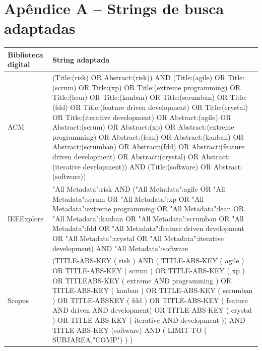 \documentclass[
	12pt,
	openright,
	twoside,
	a4paper,
	english,
	brazil
	]{abntex2}
\begin{document}
\postextual


\appendix

\chapter*{Apêndice A – Strings de busca adaptadas}

\vspace{-2em}  %

\begin{table}[h!]
  \centering
  \begin{tabular}{|l|p{12cm}|}
    \hline
    \textbf{Biblioteca digital} & \textbf{String adaptada} \\
    \hline
    ACM & (Title:(risk) OR Abstract:(risk)) AND (Title:(agile) OR Title:(scrum) OR Title:(xp) OR Title:(extreme programming) OR Title:(lean) OR Title:(kanban) OR Title:(scrumban) OR Title:(fdd) OR Title:(feature driven development) OR Title:(crystal) OR Title:(iterative development) OR Abstract:(agile) OR Abstract:(scrum) OR Abstract:(xp) OR Abstract:(extreme programming) OR Abstract:(lean) OR Abstract:(kanban) OR Abstract:(scrumban) OR Abstract:(fdd) OR Abstract:(feature driven development) OR Abstract:(crystal) OR Abstract:(iterative development)) AND (Title:(software) OR Abstract:(software)) \\
    \hline
    IEEExplore & "All Metadata":risk AND ("All Metadata":agile OR "All Metadata":scrum OR "All Metadata":xp OR "All Metadata":extreme programming OR "All Metadata":lean OR "All Metadata":kanban OR "All Metadata":scrumban OR "All Metadata":fdd OR "All Metadata":feature driven development OR "All Metadata":crystal OR "All Metadata":iterative development) AND "All Metadata":software \\
    \hline
    Scopus & (TITLE-ABS-KEY ( risk ) AND ( TITLE-ABS-KEY ( agile ) OR TITLE-ABS-KEY ( scrum ) OR TITLE-ABS-KEY ( xp ) OR TITLEABS-KEY ( extreme AND programming ) OR TITLE-ABS-KEY ( kanban ) OR TITLE-ABS-KEY ( scrumban ) OR TITLE-ABSKEY ( fdd ) OR TITLE-ABS-KEY ( feature AND driven AND development) OR TITLE-ABS-KEY ( crystal ) OR TITLE-ABS-KEY ( iterative AND development )) AND TITLE-ABS-KEY (software) AND ( LIMIT-TO ( SUBJAREA,"COMP") ) ) \\
    \hline
  \end{tabular}
\end{table}
\end{document}
